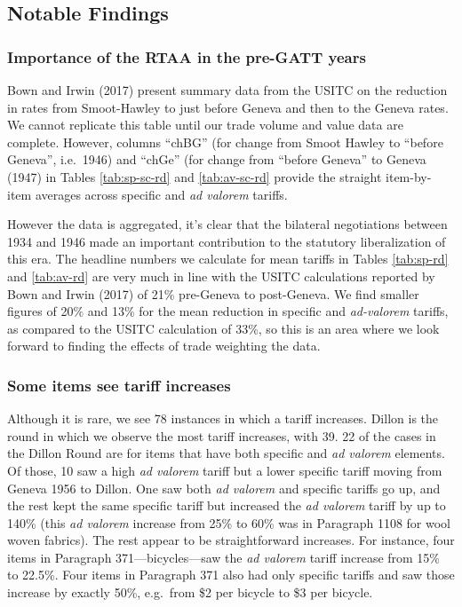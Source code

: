 \documentclass[
  12pt,
]{article}
\begin{document}
\hypertarget{notable-findings}{%
\subsection{Notable Findings}\label{notable-findings}}

\hypertarget{importance-of-the-rtaa-in-the-pre-gatt-years}{%
\subsubsection{Importance of the RTAA in the pre-GATT years}\label{importance-of-the-rtaa-in-the-pre-gatt-years}}

Bown and Irwin (2017) present summary data from the USITC on the reduction in rates from Smoot-Hawley to just before Geneva and then to the Geneva rates. We cannot replicate this table until our trade volume and value data are complete.
However, columns ``chBG'' (for change from Smoot Hawley to ``before Geneva'', i.e.~1946) and ``chGe'' (for change from ``before Geneva'' to Geneva (1947) in Tables \ref{tab:sp-sc-rd} and \ref{tab:av-sc-rd} provide the straight item-by-item averages across specific and \emph{ad valorem} tariffs.

However the data is aggregated, it's clear that the bilateral negotiations between 1934 and 1946 made an important contribution to the statutory liberalization of this era. The headline numbers we calculate for mean tariffs in Tables \ref{tab:sp-rd} and \ref{tab:av-rd} are very much in line with the USITC calculations reported by Bown and Irwin (2017) of 21\% pre-Geneva to post-Geneva. We find smaller figures of 20\% and 13\% for the mean reduction in specific and \emph{ad-valorem} tariffs, as compared to the USITC calculation of 33\%, so this is an area where we look forward to finding the effects of trade weighting the data.

\hypertarget{some-items-see-tariff-increases}{%
\subsubsection{Some items see tariff increases}\label{some-items-see-tariff-increases}}

Although it is rare, we see 78 instances in which a tariff increases. Dillon is the round in which we observe the most tariff increases, with 39. 22 of the cases in the Dillon Round are for items that have both specific and \emph{ad valorem} elements. Of those, 10 saw a high \emph{ad valorem} tariff but a lower specific tariff moving from Geneva 1956 to Dillon. One saw both \emph{ad valorem} and specific tariffs go up, and the rest kept the same specific tariff but increased the \emph{ad valorem} tariff by up to 140\% (this \emph{ad valorem} increase from 25\% to 60\% was in Paragraph 1108 for wool woven fabrics). The rest appear to be straightforward increases. For instance, four items in Paragraph 371---bicycles---saw the \emph{ad valorem} tariff increase from 15\% to 22.5\%. Four items in Paragraph 371 also had only specific tariffs and saw those increase by exactly 50\%, e.g.~from \$2 per bicycle to \$3 per bicycle.
\end{document}
